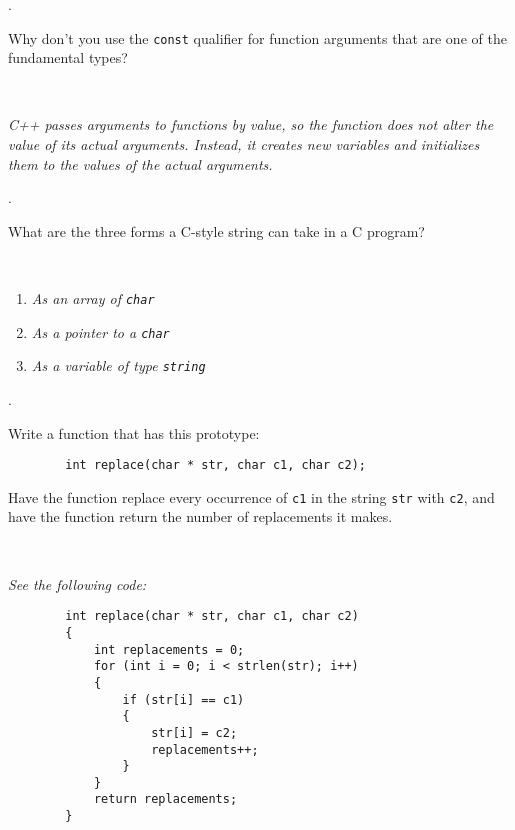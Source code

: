 \documentclass{amsart}
\begin{document}
. 
\begin{minipage}[t]{11.5 cm}
	Why don't you use the \texttt{const} qualifier for function arguments that are one of the fundamental types?
\end{minipage} \\[1ex]
\phantom{3. } 
\begin{minipage}[t]{11.5 cm}
	{\slshape C++ passes arguments to functions by value, so the function does not alter the value of its actual arguments. Instead, it creates new variables and initializes them to the values of the actual arguments.}
\end{minipage} 
\vfill

. 
\begin{minipage}[t]{11.5 cm}
	What are the three forms a C-style string can take in a C\raisebox{.15ex}{++} program?
\end{minipage} \\[1ex]
\phantom{2. } 
\begin{minipage}[t]{11.5 cm}
	\begin{enumerate}
		\item {\slshape As an array of \verb+char+}
		\item {\slshape As a pointer to a \verb+char+}
		\item {\slshape As a variable of type \verb+string+}  
	\end{enumerate}
\end{minipage} 
\vfill
\newpage

\vfill
{}. 
\begin{minipage}[t]{11.5 cm}
	Write a function that has this prototype:
	\begin{verbatim}
		int replace(char * str, char c1, char c2);
	\end{verbatim}
	Have the function replace every occurrence of \texttt{c1} in the string \texttt{str} with \texttt{c2}, and have the function return the number of replacements it makes.
\end{minipage} \\[1ex]
\phantom{3. } 
\begin{minipage}[t]{11.5 cm}
	{\slshape See the following code:}
	\begin{verbatim}
		int replace(char * str, char c1, char c2)
		{
		    int replacements = 0;
		    for (int i = 0; i < strlen(str); i++)
		    {
		        if (str[i] == c1)
		        {
		            str[i] = c2;
		            replacements++;
		        }
		    }
		    return replacements;
		}
	\end{verbatim} 
\end{minipage} 
\vfill
\end{document}
